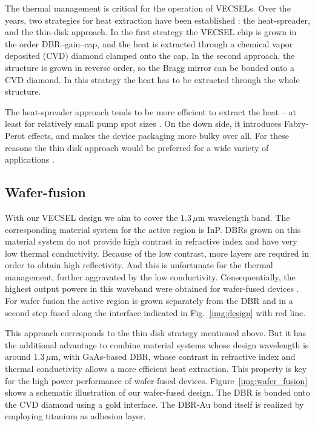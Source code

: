 The thermal management
is critical for the operation
of VECSELs.
Over the years,
two strategies
for heat extraction
have been established
\cite{Kemp2008,Vetter2012}:
the heat-spreader,
and the thin-disk approach.
In the first strategy
the VECSEL chip is grown
in the order
DBR--gain--cap,
and the heat is extracted
through a chemical vapor deposited
(CVD) diamond
clamped onto the cap.
In the second approach,
the structure is grown
in reverse order,
so the Bragg mirror
can be bonded
onto a CVD diamond.
In this strategy
the heat has to be extracted
through the whole structure.

The heat-spreader approach
tends to be more efficient
to extract the heat --
at least
for relatively small pump spot sizes
\cite{Vetter2012}.
On the down side,
it introduces Fabry-Perot effects,
and makes the device packaging
more bulky over all.
For these reasons
the thin disk approach
would be preferred
for a wide variety
of applications \cite{Ranta2014OptLett}.

\subsection{Wafer-fusion}

With our VECSEL design
we aim to cover
the $1.3\,\mu\mathrm{m}$
wavelength band.
The corresponding material system
for the active region
is InP.
DBRs grown on this material system
do not provide high contrast
in refractive index
and have very low thermal conductivity.
Because of the low contrast,
more layers
are required
in order to obtain
high reflectivity.
And this is unfortunate
for the thermal management,
further aggravated by the low conductivity.
Consequentially,
the highest output powers
in this waveband
were obtained for wafer-fused
devices \cite{Ranta2014OptLett}.
For wafer fusion
the active region
is grown separately
from the DBR
and in a second step
fused along the interface
indicated in Fig.~\ref{img:design}
with red line.

This approach corresponds to
the thin disk strategy
mentioned above.
But it has the additional advantage
to combine material systems
whose design wavelength
is around $1.3\,\mu\mathrm{m}$,
with GaAs-based DBR,
whose contrast in refractive index
and thermal conductivity
allows a more efficient heat extraction.
This property is key
for the high power performance
of wafer-fused devices.
Figure~\ref{img:wafer_fusion}
shows a schematic illustration
of our wafer-fused design.
The DBR is bonded
onto the CVD diamond
using a gold interface.
The DBR-Au bond itself
is realized by employing
titanium as adhesion layer.


